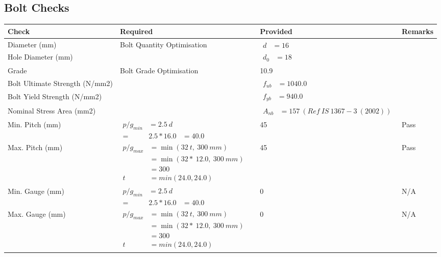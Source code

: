 \documentclass{article}%
\begin{document}
\subsection{Bolt Checks}%
\label{subsec:BoltChecks}%
\renewcommand{\arraystretch}{1.2}%
\begin{longtable}{|p{2.5cm}|p{5.5cm}|p{7cm}|p{1cm}|}%
\hline%
\rowcolor{OsdagGreen}%
Check&Required&Provided&Remarks\\%
\hline%
\endhead%
\hline%
Diameter (mm)&Bolt Quantity Optimisation&$\begin{aligned} d &=16\end{aligned}$&\\%
\hline%
Hole Diameter (mm)& &$\begin{aligned} d_0 &=18\end{aligned}$&\\%
\hline%
Grade&Bolt Grade Optimisation&10.9&\\%
\hline%
Bolt Ultimate Strength (N/mm2)&&$\begin{aligned} f_{ub} &=1040.0\end{aligned}$&\\%
\hline%
Bolt Yield Strength (N/mm2)&&$\begin{aligned} f_{yb} &=940.0\end{aligned}$&\\%
\hline%
Nominal Stress Area (mm2)& &$\begin{aligned} A_{nb} &=157~( Ref~IS~1367-3~(2002))\end{aligned}$&\\%
\hline%
Min. Pitch (mm)&$\begin{aligned}p/g_{min}&= 2.5 ~ d&\\ =&2.5*16.0&=40.0\end{aligned}$&45&Pass\\%
\hline%
Max. Pitch (mm)&$\begin{aligned}p/g_{max} &=\min(32~t,~300~mm)&\\ &=\min(32 *~12.0,~ 300 ~mm)\\&=300\\  t& = min(24.0,24.0)\end{aligned}$&45&Pass\\%
\hline%
Min. Gauge (mm)&$\begin{aligned}p/g_{min}&= 2.5 ~ d&\\ =&2.5*16.0&=40.0\end{aligned}$&0&N/A\\%
\hline%
Max. Gauge (mm)&$\begin{aligned}p/g_{max} &=\min(32~t,~300~mm)&\\ &=\min(32 *~12.0,~ 300 ~mm)\\&=300\\  t& = min(24.0,24.0)\end{aligned}$&0&N/A\\%

\end{longtable}
\end{document}
